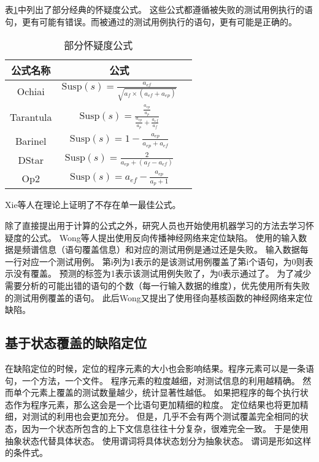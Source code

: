 表\ref{susp_formula}中列出了部分经典的怀疑度公式。
这些公式都遵循被失败的测试用例执行的语句，更有可能有错误。而被通过的测试用例执行的语句，更有可能是正确的。

\begin{table}
\centering
\begin{tabular}{|c|c|c|}
\hline
公式名称 & 公式 \\
\hline
Ochiai\parencite{Abreu2006An} & $\mathrm{Susp}(s) = \frac{a_{ef}}{\sqrt{a_{f} \times (a_{ef} + a_{ep})}}$ \\
\hline
Tarantula\parencite{Jones2002Visualization} &
$\mathrm{Susp}(s) = \frac{\frac{a_{ep}}{a_{p}}}{\frac{a_{ep}}{a_{p}} + \frac{a_{ef}}{a_{f}}}$ \\
\hline
Barinel\parencite{Abreu2009Spectrum} &
$\mathrm{Susp}(s) = 1 - \frac{a_{ep}}{a_{ep} + a_{ef}}$ \\
\hline
DStar\parencite{Wong2014The} &
$\mathrm{Susp}(s) = \frac{2}{a_{ep} + (a_f - a_{ef})}$ \\
\hline
Op2\parencite{Naish2011A} &
$\mathrm{Susp}(s) = a_{ef} - \frac{a_{ep}}{a_p + 1}$ \\
\hline
\end{tabular}
\caption{部分怀疑度公式}
\label{susp_formula}
\end{table}

Xie等人在理论上证明了不存在单一最佳公式\parencite{Xie2013A}。

除了直接提出用于计算的公式之外，研究人员也开始使用机器学习的方法去学习怀疑度的公式。
Wong等人提出使用反向传播神经网络来定位缺陷\parencite{W2009BP}。
使用的输入数据是频谱信息（语句覆盖信息）和对应的测试用例是通过还是失败。
输入数据每一行对应一个测试用例。
第i列为1表示的是该测试用例覆盖了第i个语句，为0则表示没有覆盖。
预测的标签为1表示该测试用例失败了，为0表示通过了。
为了减少需要分析的可能出错的语句的个数（每一行输入数据的维度），优先使用所有失败的测试用例覆盖的语句。
此后Wong又提出了使用径向基核函数的神经网络来定位缺陷\parencite{Wong2012Effective}。

\subsection{基于状态覆盖的缺陷定位}

在缺陷定位的时候，定位的程序元素的大小也会影响结果。程序元素可以是一条语句，一个方法，一个文件。
程序元素的粒度越细，对测试信息的利用越精确。
然而单个元素上覆盖的测试数量越少，统计显著性越低。
如果把程序的每个执行状态作为程序元素，那么这会是一个比语句更加精细的粒度。
定位结果也将更加精细，对测试的利用也会更加充分。
但是，几乎不会有两个测试覆盖完全相同的状态，因为一个状态所包含的上下文信息往往十分复杂，很难完全一致。
于是使用抽象状态代替具体状态。
使用谓词将具体状态划分为抽象状态。
谓词是形如这样的条件式。

